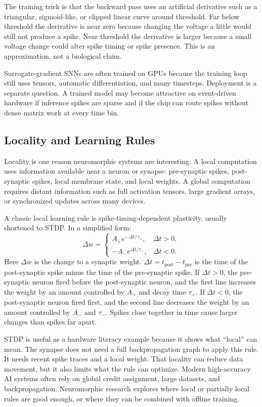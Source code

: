The training trick is that the backward pass uses an artificial derivative such as a triangular, sigmoid-like, or clipped linear curve around threshold. Far below threshold the derivative is near zero because changing the voltage a little would still not produce a spike. Near threshold the derivative is larger because a small voltage change could alter spike timing or spike presence. This is an approximation, not a biological claim.

Surrogate-gradient SNNs are often trained on GPUs because the training loop still uses tensors, automatic differentiation, and many timesteps. Deployment is a separate question. A trained model may become attractive on event-driven hardware if inference spikes are sparse and if the chip can route spikes without dense matrix work at every time bin.

\subsection{Locality and Learning Rules}

Locality is one reason neuromorphic systems are interesting. A local computation uses information available near a neuron or synapse: pre-synaptic spikes, post-synaptic spikes, local membrane state, and local weights. A global computation requires distant information such as full activation tensors, large gradient arrays, or synchronized updates across many devices.

A classic local learning rule is spike-timing-dependent plasticity, usually shortened to STDP\@. In a simplified form:
\[
  \Delta w =
  \begin{cases}
    A_+ e^{-\Delta t / \tau_+}, & \Delta t > 0,\\
    -A_- e^{\Delta t / \tau_-}, & \Delta t < 0.
  \end{cases}
\]
Here \(\Delta w\) is the change to a synaptic weight. \(\Delta t = t_{\text{post}} - t_{\text{pre}}\) is the time of the post-synaptic spike minus the time of the pre-synaptic spike. If \(\Delta t > 0\), the pre-synaptic neuron fired before the post-synaptic neuron, and the first line increases the weight by an amount controlled by \(A_+\) and decay time \(\tau_+\). If \(\Delta t < 0\), the post-synaptic neuron fired first, and the second line decreases the weight by an amount controlled by \(A_-\) and \(\tau_-\). Spikes close together in time cause larger changes than spikes far apart.

STDP is useful as a hardware literacy example because it shows what ``local'' can mean. The synapse does not need a full backpropagation graph to apply this rule. It needs recent spike traces and a local weight. That locality can reduce data movement, but it also limits what the rule can optimize. Modern high-accuracy AI systems often rely on global credit assignment, large datasets, and backpropagation. Neuromorphic research explores where local or partially local rules are good enough, or where they can be combined with offline training.

